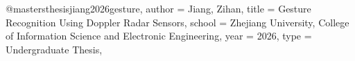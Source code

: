 

@mastersthesis{jiang2026gesture,
  author  = {Jiang, Zihan},
  title   = {Gesture Recognition Using {Doppler} Radar Sensors},
  school  = {Zhejiang University, College of Information Science
             and Electronic Engineering},
  year    = {2026},
  type    = {Undergraduate Thesis},
}
